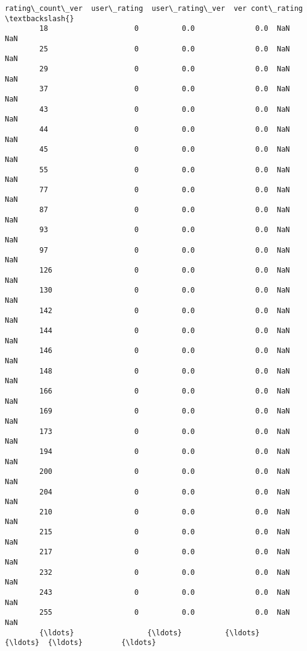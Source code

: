 \documentclass[11pt]{article}
\begin{document}
\begin{Verbatim}[commandchars=\\\{\}]
               rating\_count\_ver  user\_rating  user\_rating\_ver  ver cont\_rating  \textbackslash{}
        18                    0          0.0              0.0  NaN         NaN   
        25                    0          0.0              0.0  NaN         NaN   
        29                    0          0.0              0.0  NaN         NaN   
        37                    0          0.0              0.0  NaN         NaN   
        43                    0          0.0              0.0  NaN         NaN   
        44                    0          0.0              0.0  NaN         NaN   
        45                    0          0.0              0.0  NaN         NaN   
        55                    0          0.0              0.0  NaN         NaN   
        77                    0          0.0              0.0  NaN         NaN   
        87                    0          0.0              0.0  NaN         NaN   
        93                    0          0.0              0.0  NaN         NaN   
        97                    0          0.0              0.0  NaN         NaN   
        126                   0          0.0              0.0  NaN         NaN   
        130                   0          0.0              0.0  NaN         NaN   
        142                   0          0.0              0.0  NaN         NaN   
        144                   0          0.0              0.0  NaN         NaN   
        146                   0          0.0              0.0  NaN         NaN   
        148                   0          0.0              0.0  NaN         NaN   
        166                   0          0.0              0.0  NaN         NaN   
        169                   0          0.0              0.0  NaN         NaN   
        173                   0          0.0              0.0  NaN         NaN   
        194                   0          0.0              0.0  NaN         NaN   
        200                   0          0.0              0.0  NaN         NaN   
        204                   0          0.0              0.0  NaN         NaN   
        210                   0          0.0              0.0  NaN         NaN   
        215                   0          0.0              0.0  NaN         NaN   
        217                   0          0.0              0.0  NaN         NaN   
        232                   0          0.0              0.0  NaN         NaN   
        243                   0          0.0              0.0  NaN         NaN   
        255                   0          0.0              0.0  NaN         NaN   
        {\ldots}                 {\ldots}          {\ldots}              {\ldots}  {\ldots}         {\ldots}   

\end{Verbatim}
\end{document}
